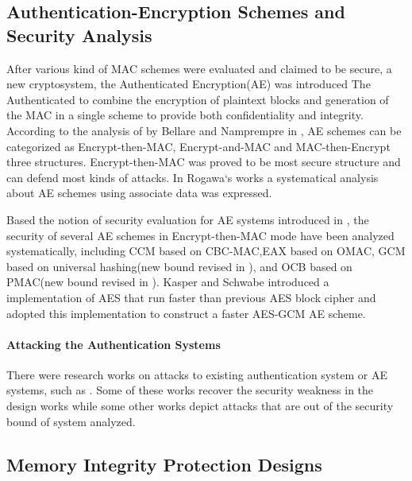 \documentclass{article}
\begin{document}
\subsection{Authentication-Encryption Schemes and Security Analysis}
After various kind of MAC schemes were evaluated and claimed to be secure, a new cryptosystem, the Authenticated Encryption(AE) was introduced The Authenticated to combine the encryption of
plaintext blocks and generation of the MAC in a single scheme to provide both
confidentiality and integrity. According to the analysis of by Bellare and Namprempre in \cite{ae-notion}, AE schemes can be categorized as Encrypt-then-MAC, Encrypt-and-MAC and MAC-then-Encrypt three structures. Encrypt-then-MAC was proved to be most secure structure and can defend most kinds of attacks. 
In Rogawa`s works \cite{aead} a systematical analysis about AE
schemes using associate data was expressed.  

Based the notion of security evaluation for AE systems introduced in \cite{aead}, the security of several AE schemes in
Encrypt-then-MAC mode have been analyzed systematically, including CCM \cite{ccm}based on
CBC-MAC,EAX\cite{eax} based on OMAC, GCM
\cite{gcm} based on universal hashing(new bound revised in \cite{breaking}), and
OCB\cite{ocb} based on PMAC(new bound revised in \cite{tweak,iPMAC}). Kasper and
Schwabe introduced a implementation of AES that run faster than previous AES block cipher
and adopted this implementation to construct a faster AES-GCM AE
scheme\cite{fast}.

\paragraph{Attacking the Authentication Systems}
There were research works on attacks to existing authentication system or AE systems, such as
\cite{cycle,attack_blk,hardware_attack}. Some of these works recover the security weakness in the design works while some other works depict attacks that are out of the security bound of system analyzed. 

\subsection{Memory Integrity Protection Designs}
\end{document}
